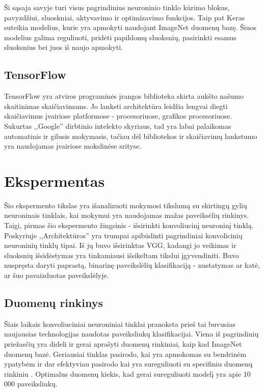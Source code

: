 \documentclass{VUMIFPSkursinis}
\begin{document}
Ši sąsaja savyje turi visus pagrindinius neuroninio tinklo kūrimo blokus, pavyzdžiui, sluoskniai, aktyvavimo ir optimizavimo funkcijos. Taip pat Keras suteikia modelius, 
kurie yra apmokyti naudojant ImageNet duomenų bazę. Šiuos modelius galima reguliuoti, pridėti papildomų sluoksnių, pasirinkti esamus sluoksnius bei juos iš naujo apmokyti.

\subsection{TensorFlow}
TensorFlow yra atviros programinės įrangos biblioteka skirta aukšto našumo skaitinimas skaičiavimams. Jo lanksti architektūra leidžia lengvai diegti skaičiavimus įvairiose 
platformose - procesoriuose, grafikos procesoriuose. Sukurtas ,,Google'' dirbtinio intelekto skyriaus, tad yra labai palaikomas automatinis ir gilusis mokymasis, tačiau 
dėl bibliotekos ir skaičiavimų lankstumo yra naudojamas įvairiose mokslinėse srityse.

\section{Ekspermentas}
Šio ekspermento tikslas yra išanalizuoti mokymosi tikslumą su skirtingų gylių neuroninais tinklais, kai mokymui yra naudojamas mažas paveiksėlių rinkinys. Taigi, pirmas 
šio ekspermento žingsinis - išsirinkti konvoliucinį neuroninį tinklą. Poskyriuje ,,Architektūros'' yra trumpai apibūdinti pagrindiniai konvolicinių neuroninių tinklų tipai. 
Iš jų buvo išsirinktas VGG, kadangi jo veikimas ir sluoksnių išsidėstymas yra tinkamiausi išsikeltam tikslui įgyvendiniti. Buvo nuspręsta daryti paprastą, binarinę paveikslėlių 
klasifikaciją - nustatymas ar katė, ar šuo pavaizduotas paveikslėlyje.

\subsection{Duomenų rinkinys}
Šiais laikais konvoliuciniai neuroniniai tinklai pranoksta prieš tai buvusias naujausias technologijas naudotas paveiksliukų klasifikacijai. Viena iš pagrindinių priežasčių 
yra dideli ir gerai aprašyti duomenų rinkiniai, kaip kad ImageNet duomenų bazė. Geriausiai tinklas pasirodo, kai yra apmokomas su bendrinėm ypatybėm ir dar efektyviau 
pasirodo kai yra sureguliuoti su specifiniu duomenų rinkiniu \cite{DBLP:conf/eccv/ChuMBHD16}. Optimalus duomenų kiekis, kad gerai sureguliuoti 
modelį yra apie 10 000 paveiksliukų. 
\end{document}
